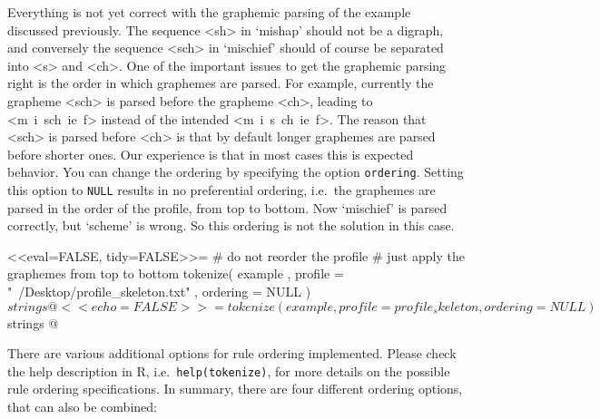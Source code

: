 Everything is not yet correct with the graphemic parsing of the example discussed
previously. The sequence <sh> in `mishap' should not be a digraph, and
conversely the sequence <sch> in `mischief' should of course be separated into
<s> and <ch>. One of the important issues to get the graphemic parsing right is
the order in which graphemes are parsed. For example, currently the grapheme
<sch> is parsed before the grapheme <ch>, leading to <m\ i\ sch\ ie\ f> instead
of the intended <m\ i\ s\ ch\ ie\ f>. The reason that <sch> is parsed before
<ch> is that by default longer graphemes are parsed before shorter ones. Our
experience is that in most cases this is expected behavior. You can change the
ordering by specifying the option \texttt{ordering}. Setting this option to
\texttt{NULL} results in no preferential ordering, i.e.\ the graphemes are parsed
in the order of the profile, from top to bottom. Now `mischief' is parsed
correctly, but `scheme' is wrong. So this ordering is not the solution in this
case.

<<eval=FALSE, tidy=FALSE>>= 
# do not reorder the profile
# just apply the graphemes from top to bottom
tokenize( example
         , profile = "~/Desktop/profile_skeleton.txt"
         , ordering = NULL
        )$strings
@

<<echo=FALSE>>=
tokenize( example, profile = profile_skeleton, ordering = NULL)$strings
@

There are various additional options for rule ordering implemented. Please check
the help description in R, i.e.\ \texttt{help(tokenize)}, for more details on the
possible rule ordering specifications. In summary, there are four different 
ordering options, that can also be combined:

